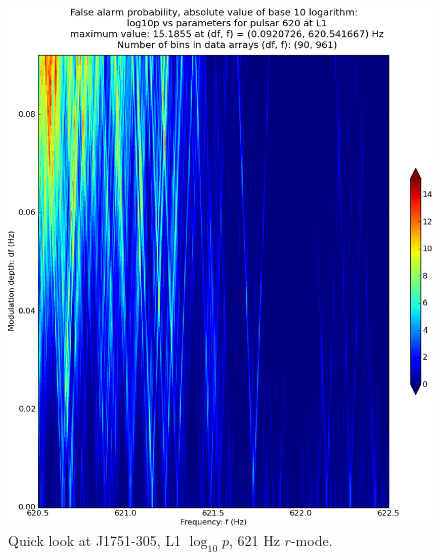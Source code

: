 \begin{figure}
\begin{center}
\includegraphics[width=0.68\paperwidth,height=0.48\paperheight]{plots/DFvsFresultsProb-L1_pulsar-620.eps}
\caption{
Quick look at J1751-305, L1 $\log_{10}p$, 621 Hz $r$-mode.}
\end{center}
\end{figure}


